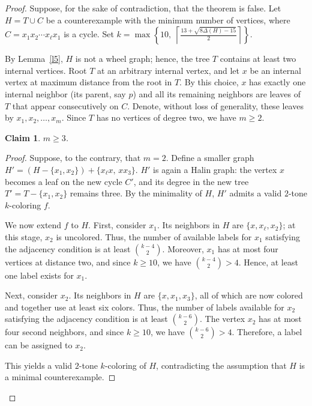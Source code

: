 \documentclass[12pt]{article}
\numberwithin{theorem}{section}
\numberwithin{conjecture}{section}
\numberwithin{corollary}{section}
\numberwithin{example}{section}
\numberwithin{lemma}{section}
\numberwithin{proposition}{section}
\numberwithin{problem}{section}
\numberwithin{remark}{section}
\newtheorem{claim}{Claim}
\numberwithin{claim}{theorem}
\numberwithin{definition}{section}
\begin{document}
\begin{proof}
Suppose, for the sake of contradiction, that the theorem is false. 
Let $H = T \cup C$ be a counterexample with the minimum number of vertices, 
where $C = x_1 x_2 \cdots x_\ell x_1$ is a cycle. Set $k = \max\left\{
10,\;
\left\lceil \frac{13+\sqrt{8\Delta(H)-15}}{2} \right\rceil
\right\}$.

\noindent By Lemma~\ref{l5}, $H$ is not a wheel graph; hence, the tree $T$ contains at least two internal vertices. Root $T$ at an arbitrary internal vertex, and let $x$ be an internal vertex at maximum distance from the root in $T$. By this choice, $x$ has exactly one internal neighbor (its parent, say $p$) and all its remaining neighbors are leaves of $T$ that appear consecutively on $C$. Denote, without loss of generality, these leaves by $x_1,x_2,\dots,x_m$. Since $T$ has no vertices of degree two, we have $m\ge 2$.

\begin{claim} 
 $m\ge 3$.
\end{claim}

\begin{proof}
Suppose, to the contrary, that $m= 2$. Define a smaller graph $H' = (H - \{x_1,x_2\})+ \{x_\ell x,\, x x_3\}$. $H'$ is again a Halin graph: the vertex $x$ becomes a leaf on the new cycle $C'$, and its degree in the new tree $T' = T - \{x_1,x_2\}$ remains three. By the minimality of $H$, $H'$ admits a valid $2$-tone $k$-coloring $f$.

\noindent We now extend $f$ to $H$. First, consider $x_1$. Its neighbors in $H$ are $\{x,x_\ell,x_2\}$; at this stage, $x_2$ is uncolored. Thus, the number of available labels for $x_1$ satisfying the adjacency condition is at least $\binom{k-4}{2}$. Moreover, $x_1$ has at most four vertices at distance two, and since $k\ge 10$, we have $\binom{k-4}{2}>4$. Hence, at least one label exists for $x_1$.

\noindent Next, consider $x_2$. Its neighbors in $H$ are $\{x,x_1,x_3\}$, all of which are now colored and together use at least six colors. Thus, the number of labels available for $x_2$ satisfying the adjacency condition is at least $\binom{k-6}{2}$. The vertex $x_2$ has at most four second neighbors, and since $k\ge 10$, we have $\binom{k-6}{2}>4$. Therefore, a label can be assigned to $x_2$.

\noindent This yields a valid $2$-tone $k$-coloring of $H$, contradicting the assumption that $H$ is a minimal counterexample.\end{proof}


\end{proof}
\end{document}

